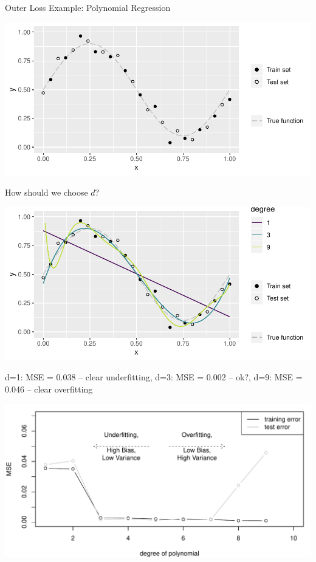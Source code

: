     \begin{frame}[c,allowframebreaks]{Outer Loss Example: Polynomial Regression}

    \begin{center}
    \includegraphics[width=.7\textwidth]{polyt}
    \end{center}

    \framebreak

    How should we choose $d$?

    \begin{center}
    \includegraphics[width=.5\textwidth]{poly-test}
    \end{center}

    d=1: MSE = 0.038 -- clear underfitting, d=3: MSE = 0.002 -- ok?, d=9: MSE =
    0.046 -- clear overfitting

    \framebreak

    \begin{center}
    \includegraphics[width=.9\textwidth]{bias-variance}
    \end{center}

    \end{frame}

